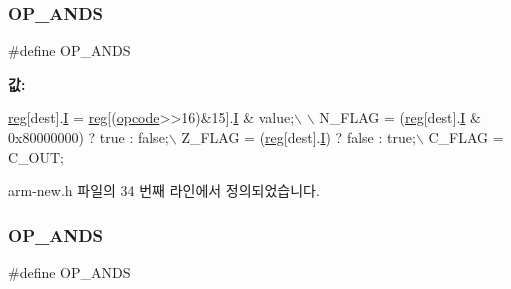 \subsubsection{\texorpdfstring{O\+P\+\_\+\+A\+N\+DS}{OP\_ANDS}\hspace{0.1cm}{\footnotesize\ttfamily [1/2]}}
{\footnotesize\ttfamily \#define O\+P\+\_\+\+A\+N\+DS}

{\bfseries 값\+:}
\begin{DoxyCode}
\mbox{\hyperlink{_g_b_a_8h_ae29faba89509024ffd1a292badcedf2d}{reg}}[dest].\mbox{\hyperlink{unionreg__pair_a9f6a42d56c07829d7013571eda998252}{I}} = \mbox{\hyperlink{_g_b_a_8h_ae29faba89509024ffd1a292badcedf2d}{reg}}[(\mbox{\hyperlink{arm-new_8h_a4fc220098f4b9d0e039a28274d05c198}{opcode}}>>16)&15].\mbox{\hyperlink{arm-new_8h_a782b7c7c9a56a2031f6270eac7f000d6}{I}} & value;\(\backslash\)
      \(\backslash\)
      N\_FLAG = (\mbox{\hyperlink{_g_b_a_8h_ae29faba89509024ffd1a292badcedf2d}{reg}}[dest].\mbox{\hyperlink{unionreg__pair_a9f6a42d56c07829d7013571eda998252}{I}} & 0x80000000) ? \textcolor{keyword}{true} : \textcolor{keyword}{false};\(\backslash\)
      Z\_FLAG = (\mbox{\hyperlink{_g_b_a_8h_ae29faba89509024ffd1a292badcedf2d}{reg}}[dest].\mbox{\hyperlink{unionreg__pair_a9f6a42d56c07829d7013571eda998252}{I}}) ? \textcolor{keyword}{false} : \textcolor{keyword}{true};\(\backslash\)
      C\_FLAG = C\_OUT;
\end{DoxyCode}


arm-\/new.\+h 파일의 34 번째 라인에서 정의되었습니다.

\mbox{\label{_g_b_a_8cpp_aa69b64b0a164fc639f436a21fdacf2fd}} 
\subsubsection{\texorpdfstring{O\+P\+\_\+\+A\+N\+DS}{OP\_ANDS}\hspace{0.1cm}{\footnotesize\ttfamily [2/2]}}
{\footnotesize\ttfamily \#define O\+P\+\_\+\+A\+N\+DS}

